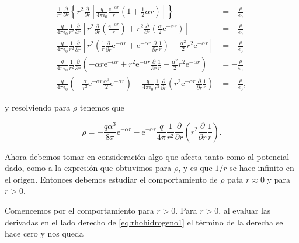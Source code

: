 \documentclass[a4paper,10pt]{article}
\numberwithin{equation}{section}
\newcommand{\euler}{\mathrm{e}}
\begin{document}
\begin{align*}
  \frac{1}{r^2}\frac{\partial}{\partial r}
 \left\{r^2\frac{\partial}{\partial r}\left[\frac{q}{4\pi\epsilon_0}
 \frac{\euler^{-\alpha r}}{r}\left(1 + \frac{1}{2}\alpha r\right)\right] \right\} &= 
 - \frac{\rho}{\epsilon_0} \\
 \frac{q}{4\pi\epsilon_0}\frac{1}{r^2}\frac{\partial}{\partial r}
 \left[r^2\frac{\partial}{\partial r}\left(\frac{\euler^{-\alpha r}}{r}\right) 
 + r^2\frac{\partial}{\partial r}\left(\frac{\alpha}{2}\euler^{-\alpha r}\right)
 \right] &= - \frac{\rho}{\epsilon_0} \\
  \frac{q}{4\pi\epsilon_0}\frac{1}{r^2}\frac{\partial}{\partial r}
  \left[r^2\left(\frac{1}{r}\frac{\partial}{\partial r}\euler^{-\alpha r}
  + \euler^{-\alpha r}\frac{\partial}{\partial r}\frac{1}{r}\right)
  - \frac{\alpha^2}{2}r^2\euler^{-\alpha r}\right] &= - \frac{\rho}{\epsilon_0} \\
  \frac{q}{4\pi\epsilon_0}\frac{1}{r^2}\frac{\partial}{\partial r}
  \left(-\alpha r \euler^{-\alpha r} + r^2\euler^{-\alpha r} 
  \frac{\partial}{\partial r}\frac{1}{r} - \frac{\alpha^2}{2}r^2\euler^{-\alpha r}
  \right) &= - \frac{\rho}{\epsilon_0} \\
  \frac{q}{4\pi\epsilon_0}\left(-\frac{\alpha}{r^2}\euler^{-\alpha r} 
  \frac{\alpha^3}{2}\euler^{-\alpha r}\right) + \frac{q}{4\pi\epsilon_0}
  \frac{1}{r^2}\frac{\partial}{\partial r}\left(r^2\euler^{-\alpha r} 
  \frac{\partial}{\partial r}\frac{1}{r}\right) &= - \frac{\rho}{\epsilon_0}, 
\end{align*}

y resolviendo para $\rho$ tenemos que 

\begin{equation}
 \rho = - \frac{q\alpha^3}{8\pi}\euler^{-\alpha r} - 
 \euler^{-\alpha r}\frac{q}{4\pi}\frac{1}{r^2}\frac{\partial}{\partial r}
 \left(r^2\frac{\partial}{\partial r}\frac{1}{r} \right).
 \label{eq:rhohidrogeno1}
\end{equation}

Ahora debemos tomar en consideración algo que afecta tanto como al potencial dado,
como a la expresión que obtuvimos para $\rho$, y es que $1/r$ se hace infinito en 
el origen. Entonces debemos estudiar el comportamiento de $\rho$ pata $r \approx 
0$ y para $r > 0$. 

\vspace{.3cm}

Comencemos por el comportamiento para $r > 0$. Para $r > 0$, al evaluar las derivadas 
en el lado derecho de \eqref{eq:rhohidrogeno1} el término de la derecha se hace 
cero y nos queda 
\end{document}
